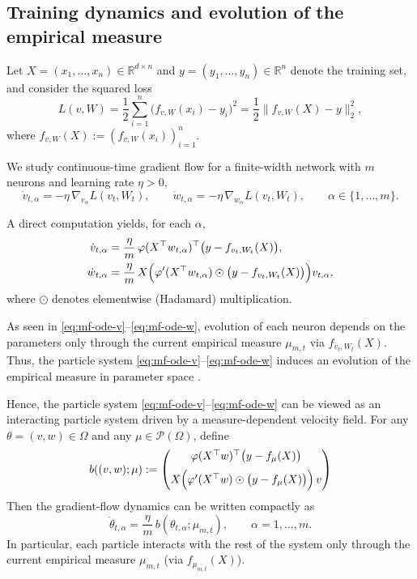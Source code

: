 \subsection{Training dynamics and evolution of the empirical measure}

Let $X=(x_1,\dots,x_n)\in\mathbb R^{d\times n}$ and
$y=(y_1,\ldots,y_n)\in\mathbb R^n$ denote the training set, and consider the
squared loss
\[
	L(v,W)
	=
	\frac12\sum_{i=1}^n\bigl(f_{v,W}(x_i)-y_i\bigr)^2
	=
	\frac12\|f_{v,W}(X)-y\|_2^2,
\]
where $f_{v,W}(X):=(f_{v,W}(x_i))_{i=1}^n$.

We study continuous-time gradient flow for a finite-width network with $m$
neurons and learning rate $\eta>0$,
\[
	\dot v_{t,\alpha}
	=
	-\eta\,\nabla_{v_\alpha}L(v_t,W_t),
	\qquad
	\dot w_{t,\alpha}
	=
	-\eta\,\nabla_{w_\alpha}L(v_t,W_t),
	\qquad
	\alpha\in\{1,\dots,m\}.
\]

A direct computation yields, for each $\alpha$,
\begin{align}
	\dot v_{t, \alpha}
	 & =
	\frac{\eta}{m}\,
	\varphi(X^\top w_{t,\alpha})^\top
	\bigl(y-f_{v_t,W_t}(X)\bigr),
	\label{eq:mf-ode-v} \\
	\dot w_{t,\alpha}
	 & =
	\frac{\eta}{m}\,
	X\Bigl(
	\varphi'(X^\top w_{t,\alpha})
	\odot
	\bigl(y-f_{v_t,W_t}(X)\bigr)
	\Bigr)v_{t,\alpha},
	\label{eq:mf-ode-w}
\end{align}
where $\odot$ denotes elementwise (Hadamard) multiplication.

As seen in \eqref{eq:mf-ode-v}--\eqref{eq:mf-ode-w}, evolution of
each neuron depends on the
parameters only through the current empirical measure $\mu_{m,t}$ via $f_{v_t, W_t}(X)$.
Thus, the particle system \eqref{eq:mf-ode-v}--\eqref{eq:mf-ode-w} induces an
evolution of the empirical measure in parameter space
\citep{Mei2018meanfieldview,Rotskoff_2022}.

Hence, the particle system \eqref{eq:mf-ode-v}--\eqref{eq:mf-ode-w} can be viewed as
an interacting particle system driven by a measure-dependent velocity field.
For any $\theta=(v,w)\in\Omega$ and any $\mu\in\mathcal P(\Omega)$, define
\[
	b((v,w);\mu)
	:=
	\begin{pmatrix}
		\varphi(X^\top w)^\top\bigl(y-f_\mu(X)\bigr) \\[2mm]
		X\Bigl(\varphi'(X^\top w)\odot\bigl(y-f_\mu(X)\bigr)\Bigr)\,v
	\end{pmatrix}
\]
Then the gradient-flow dynamics can be written compactly as
\[
	\dot\theta_{t,\alpha}
	=
	\frac{\eta}{m}\,b(\theta_{t,\alpha};\mu_{m,t}),
	\qquad \alpha=1,\dots,m.
\]
In particular, each particle interacts with the rest of the system only through the
current empirical measure $\mu_{m,t}$ (via $f_{\mu_{m,t}}(X)$).

